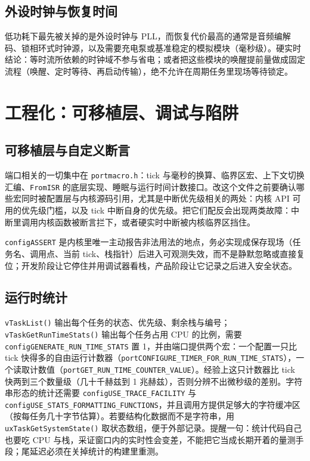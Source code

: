 \documentclass[12pt,a4paper,fontset=fandol]{ctexbook}
\newcommand{\Fn}[1]{\texttt{#1()}}
\newcommand{\Tp}[1]{\texttt{#1}}
\newcommand{\Bk}{\discretionary{}{}{}}
\begin{document}
\subsection{外设时钟与恢复时间}

低功耗下最先被关掉的是外设时钟与 PLL，而恢复代价最高的通常是音频编解码、锁相环式时钟源，以及需要充电泵或基准稳定的模拟模块（毫秒级）。硬实时结论：等时流所依赖的时钟域不参与省电；或者把这些模块的唤醒提前量做成固定流程（唤醒、定时等待、再启动传输），绝不允许在周期任务里现场等待锁定。

\section{工程化：可移植层、调试与陷阱}

\subsection{可移植层与自定义断言}

端口相关的一切集中在 \Tp{portmacro.h}：tick 与毫秒的换算、临界区宏、上下文切换汇编、\Tp{FromISR} 的底层实现、睡眠与运行时间计数接口。改这个文件之前要确认哪些宏同时被配置层与内核源码引用，尤其是中断优先级相关的两处：内核 API 可用的优先级门槛，以及 tick 中断自身的优先级。把它们配反会出现两类故障：中断里调用内核函数被断言拦下，或者硬实时中断被内核临界区挡住。

\Tp{configASSERT} 是内核里唯一主动报告非法用法的地点，务必实现成保存现场（任务名、调用点、当前 tick、栈指针）后进入可观测失效，而不是静默忽略或直接复位；开发阶段让它停住并用调试器看栈，产品阶段让它记录之后进入安全状态。

\subsection{运行时统计}

\Fn{vTaskList} 输出每个任务的状态、优先级、剩余栈与编号；\Fn{vTaskGetRunTimeStats} 输出每个任务占用 CPU 的比例，需要 \Tp{configGENERATE\_{\Bk}RUN\_{\Bk}TIME\_{\Bk}STATS} 置 1，并由端口提供两个宏：一个配置一只比 tick 快得多的自由运行计数器（\Tp{portCONFIGURE\_{\Bk}TIMER\_{\Bk}FOR\_{\Bk}RUN\_{\Bk}TIME\_{\Bk}STATS}），一个读取计数值（\Tp{portGET\_{\Bk}RUN\_{\Bk}TIME\_{\Bk}COUNTER\_{\Bk}VALUE}）。经验上这只计数器比 tick 快两到三个数量级（几十千赫兹到 1 兆赫兹），否则分辨不出微秒级的差别。字符串形态的统计还需要 \Tp{configUSE\_{\Bk}TRACE\_{\Bk}FACILITY} 与 \Tp{configUSE\_{\Bk}STATS\_{\Bk}FORMATTING\_{\Bk}FUNCTIONS}，并且调用方提供足够大的字符缓冲区（按每任务几十字节估算）。若要结构化数据而不是字符串，用 \Fn{uxTaskGetSystemState} 取状态数组，便于外部记录。提醒一句：统计代码自己也要吃 CPU 与栈，采证窗口内的实时性会变差，不能把它当成长期开着的量测手段；尾延迟必须在关掉统计的构建里重测。
\end{document}
